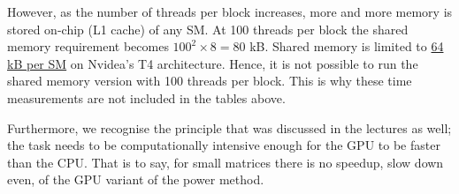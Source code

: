 However, as the number of threads per block increases, more and more memory is stored on-chip (L1 cache) of any SM. 
At 100 threads per block the shared memory requirement becomes $100^2 \times 8 = 80$ kB. Shared memory is limited to 
\href{https://www.techpowerup.com/gpu-specs/tesla-t4.c3316}{64 kB per SM} on Nvidea's T4 architecture. Hence, it is not 
possible to run the shared memory version with 100 threads per block. This is why these time measurements are not included 
in the tables above.

Furthermore, we recognise the principle that was discussed in the lectures as well; the task needs to be 
computationally intensive enough for the GPU to be faster than the CPU. That is to say, for small matrices
there is no speedup, slow down even, of the GPU variant of the power method.